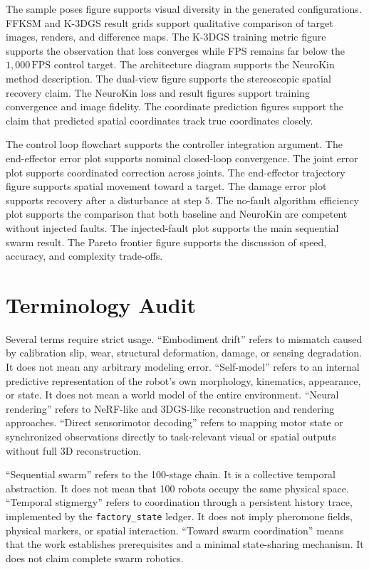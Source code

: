 \documentclass[12pt,a4paper,oneside]{report}
\begin{document}
The sample poses figure supports visual diversity in the generated configurations. FFKSM and K-3DGS result grids support qualitative comparison of target images, renders, and difference maps. The K-3DGS training metric figure supports the observation that loss converges while FPS remains far below the $1{,}000\,\mathrm{FPS}$ control target. The architecture diagram supports the NeuroKin method description. The dual-view figure supports the stereoscopic spatial recovery claim. The NeuroKin loss and result figures support training convergence and image fidelity. The coordinate prediction figures support the claim that predicted spatial coordinates track true coordinates closely.

The control loop flowchart supports the controller integration argument. The end-effector error plot supports nominal closed-loop convergence. The joint error plot supports coordinated correction across joints. The end-effector trajectory figure supports spatial movement toward a target. The damage error plot supports recovery after a disturbance at step $5$. The no-fault algorithm efficiency plot supports the comparison that both baseline and NeuroKin are competent without injected faults. The injected-fault plot supports the main sequential swarm result. The Pareto frontier figure supports the discussion of speed, accuracy, and complexity trade-offs.

\section{Terminology Audit}

Several terms require strict usage. ``Embodiment drift'' refers to mismatch caused by calibration slip, wear, structural deformation, damage, or sensing degradation. It does not mean any arbitrary modeling error. ``Self-model'' refers to an internal predictive representation of the robot's own morphology, kinematics, appearance, or state. It does not mean a world model of the entire environment. ``Neural rendering'' refers to NeRF-like and 3DGS-like reconstruction and rendering approaches. ``Direct sensorimotor decoding'' refers to mapping motor state or synchronized observations directly to task-relevant visual or spatial outputs without full 3D reconstruction.

``Sequential swarm'' refers to the 100-stage chain. It is a collective temporal abstraction. It does not mean that 100 robots occupy the same physical space. ``Temporal stigmergy'' refers to coordination through a persistent history trace, implemented by the \texttt{factory\_state} ledger. It does not imply pheromone fields, physical markers, or spatial interaction. ``Toward swarm coordination'' means that the work establishes prerequisites and a minimal state-sharing mechanism. It does not claim complete swarm robotics.
\end{document}
